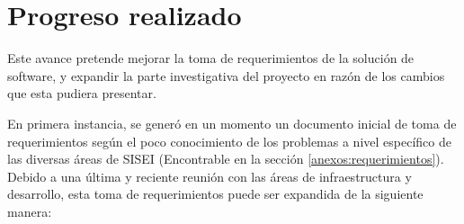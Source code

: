 \section{Progreso realizado}

Este avance pretende mejorar la toma de requerimientos de la solución de software, y expandir la parte investigativa del proyecto en razón de los cambios que esta pudiera presentar.

En primera instancia, se generó en un momento un documento inicial de toma de requerimientos según el poco conocimiento de los problemas a nivel específico de las diversas áreas de SISEI (Encontrable en la sección \ref{anexos:requerimientos}). Debido a una última y reciente reunión con las áreas de infraestructura y desarrollo, esta toma de requerimientos puede ser expandida de la siguiente manera:

